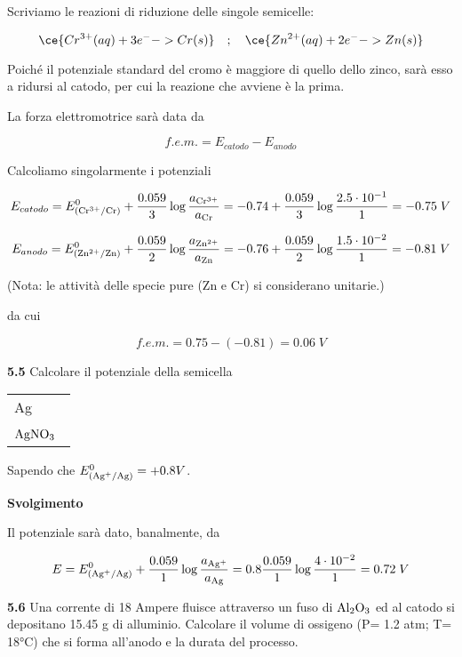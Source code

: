 \vspace{0.2cm}Scriviamo le reazioni di riduzione delle singole semicelle:

$$\ce{Cr^{3+}(aq) + 3 e^- -> Cr(s)}
\quad;\quad
\ce{Zn^{2+}(aq)  + 2 e^- -> Zn(s)}$$

Poiché il potenziale standard del cromo è maggiore di quello dello zinco, sarà esso a ridursi al catodo, per cui la reazione che avviene è la prima.

La forza elettromotrice sarà data da

$$f.e.m. = E_{catodo} - E_{anodo}$$

Calcoliamo singolarmente i potenziali

$$E_{catodo}
=E^0_{(\rm Cr^{3+}/Cr)} + \frac{0.059}{3} \log \frac{a_{\rm Cr^{3+}}}{a_{\rm Cr}}
=-0.74 + \frac{0.059}{3} \log \frac{2.5 \cdot 10^{-1}}{1}
=-0.75\;V$$

$$E_{anodo} = E^0_{(\rm Zn^{2+}/Zn)} + \frac{0.059}{2} \log \frac{a_{\rm Zn^{2+}}}{a_{\rm Zn}}
=-0.76 + \frac{0.059}{2} \log \frac{1.5 \cdot 10^{-2}}{1}
=-0.81\;V$$

(Nota: le attività delle specie pure (Zn e Cr) si considerano unitarie.)

da cui

$$f.e.m.=0.75 - (-0.81) = 0.06\;V$$

\vspace{0.2cm}\textbf{5.5} Calcolare il potenziale della semicella 

\begin{center}
    \begin{tabular}{|p{3.7cm}|}
         Ag\\[0.5ex]
         $\rm AgNO_3$ \, \\[0.5ex]
    \end{tabular}
\end{center}

Sapendo che $E^{0}_{(\rm Ag^{+}/Ag)}=+0.8V$.

\vspace{0.2cm}\large\textbf{Svolgimento}\normalsize

\vspace{0.2cm}Il potenziale sarà dato, banalmente, da

$$E = E^0_{(\rm Ag^{+}/Ag)} + \frac{0.059}{1} \log \frac{a_{\rm Ag^{+}}}{a_{\rm Ag}}
=0.8 \frac{0.059}{1} \log \frac{4 \cdot 10^{-2}}{1}
=0.72\;V$$

\vspace{0.2cm}\textbf{5.6} Una corrente di 18 Ampere fluisce attraverso un fuso di $\rm Al_2O_3$ ed al catodo si depositano 15.45 g di alluminio. Calcolare il volume di ossigeno (P= 1.2 atm; T= 18°C) che si forma all'anodo e la
durata del processo.

